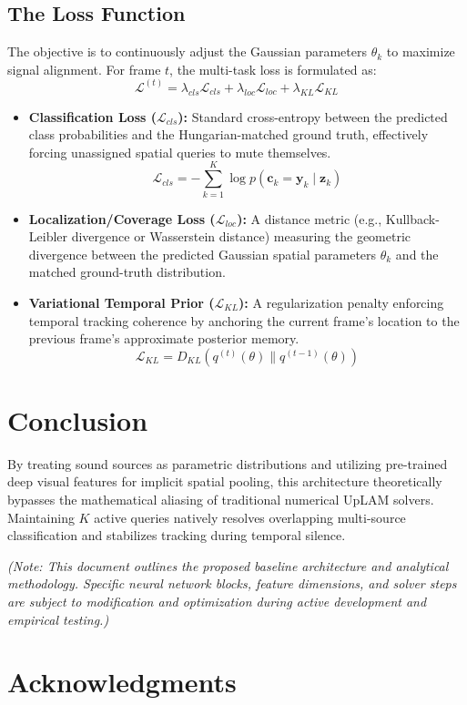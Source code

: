 \documentclass{article}
\begin{document}
\subsection{The Loss Function}
The objective is to continuously adjust the Gaussian parameters $\theta_k$ to maximize signal alignment. For frame $t$, the multi-task loss is formulated as:
\begin{equation}
    \mathcal{L}^{(t)} = \lambda_{cls} \mathcal{L}_{cls} + \lambda_{loc} \mathcal{L}_{loc} + \lambda_{KL} \mathcal{L}_{KL}
\end{equation}
\begin{itemize}
    \item \textbf{Classification Loss ($\mathcal{L}_{cls}$):} Standard cross-entropy between the predicted class probabilities and the Hungarian-matched ground truth, effectively forcing unassigned spatial queries to mute themselves.
    \begin{equation}
        \mathcal{L}_{cls} = - \sum_{k=1}^K \log p(\mathbf{c}_k = \mathbf{y}_k \mid \mathbf{z}_k)
    \end{equation}
    \item \textbf{Localization/Coverage Loss ($\mathcal{L}_{loc}$):} A distance metric (e.g., Kullback-Leibler divergence or Wasserstein distance) measuring the geometric divergence between the predicted Gaussian spatial parameters $\theta_k$ and the matched ground-truth distribution.
    \item \textbf{Variational Temporal Prior ($\mathcal{L}_{KL}$):} A regularization penalty enforcing temporal tracking coherence by anchoring the current frame's location to the previous frame's approximate posterior memory.
    \begin{equation}
        \mathcal{L}_{KL} = D_{KL}( q^{(t)}(\theta) \parallel q^{(t-1)}(\theta) )
    \end{equation}
\end{itemize}

\section{Conclusion}
By treating sound sources as parametric distributions and utilizing pre-trained deep visual features for implicit spatial pooling, this architecture theoretically bypasses the mathematical aliasing of traditional numerical UpLAM solvers. Maintaining $K$ active queries natively resolves overlapping multi-source classification and stabilizes tracking during temporal silence. 

\textit{(Note: This document outlines the proposed baseline architecture and analytical methodology. Specific neural network blocks, feature dimensions, and solver steps are subject to modification and optimization during active development and empirical testing.)}

\section*{Acknowledgments}

  
  
\end{document}
